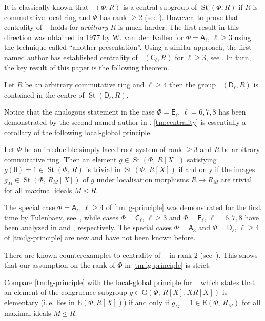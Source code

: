 \documentclass[11pt]{amsart}
\theoremstyle{plain} \declaretheorem[name=Theorem, Refname={Theorem,Theorems}]{tm} \Crefname{tm}{Theorem}{Theorems}
\numberwithin{equation}{section}
\theoremstyle{definition} \newtheorem{df}[lm]{Definition} \Crefname{df}{Definition}{Definitions}
\theoremstyle{remark} \newtheorem{rk}[lm]{Remark} \Crefname{rk}{Remark}{Remarks}
\newcommand{\E}{{\mathrm{E}}}
\newcommand{\GG}{{\mathrm{G}}}
\newcommand{\St}{\mathop{\mathrm{St}}\nolimits}
\newcommand{\Kt}{\mathop{\mathrm{K_2}}\nolimits}
\newcommand{\Ko}{\mathop{\mathrm{K_1}}\nolimits}
\newcommand{\rA}{\mathsf{A}}
\newcommand{\rC}{\mathsf{C}}
\newcommand{\rD}{\mathsf{D}}
\newcommand{\rE}{\mathsf{E}}
\begin{document}
It is classically known that $\Kt(\Phi, R)$ is a central subgroup of $\St(\Phi, R)$ if $R$ is commutative local ring and $\Phi$ has rank $\geq 2$ (see \cite{St73}).
However, to prove that centrality of $\Kt$ holds for \emph{arbitrary} $R$ is much harder.
The first result in this direction was obtained in 1977 by W. van~der~Kallen for $\Phi=\rA_\ell$, $\ell\geq 3$ using the technique called ``another presentation''.
Using a similar approach, the first-named author has established centrality of $\Kt(\rC_\ell, R)$ for $\ell\geq 3$, see \cite{Lav}.
In turn, the key result of this paper is the following theorem.
\begin{tm}\label{tm:centrality}  Let $R$ be an arbitrary commutative ring and $\ell\geq 4$ then 
the group $\Kt(\rD_\ell, R)$ is contained in the centre of $\St(\rD_\ell, R)$. \end{tm}
Notice that the analogous statement in the case $\Phi=\rE_\ell$, $\ell=6,7,8$ has been demonstrated by the second named author in \cite{SCh}.
\cref{tm:centrality} is essentially a corollary of the following local-global principle.
\begin{tm}\label{tm:lg-principle} Let $\Phi$ be an irreducible simply-laced root system of rank $\geq 3$ and $R$ be arbitrary commutative ring.
Then an element $g\in\St(\Phi,\,R[X])$ satisfying $g(0)=1\in\St(\Phi,\,R)$ is trivial in $\St(\Phi,\,R[X])$
if and only if the images $g_M\in\St(\Phi,\,R_M[X])$ of $g$ under localisation morphisms $R\to R_M$ are trivial for all maximal ideals $M\trianglelefteq R$. \end{tm} 

The special case $\Phi=\rA_\ell$, $\ell\geq 4$ of \cref{tm:lg-principle} was demonstrated for the first time by Tulenbaev, see~\cite[Theorem~2.1]{Tul},
while cases $\Phi=\rC_\ell$, $\ell\geq 3$ and $\Phi=\rE_\ell$, $\ell=6,7,8$ have been analyzed in \cite{Lav2} and \cite{SCh}, respectively.
The special cases $\Phi=\rA_3$ and $\Phi=\rD_\ell$, $\ell\geq 4$ of \cref{tm:lg-principle} are new and have not been known before.

There are known counterexamples to centrality of $\Kt$ in rank $2$ (see~\cite{W}).
This shows that our assumption on the rank of $\Phi$ in \cref{tm:lg-principle} is strict.

Compare \cref{tm:lg-principle} with the local-global principle for $\Ko$ which states that an element of the congruence subgroup $g\in \GG(\Phi,\,R[X], XR[X])$ is elementary
(i.\,e. lies in $\E(\Phi, R[X])$) if and only if $g_M=1\in\E(\Phi,\,R_M)$ for all maximal ideals $M \trianglelefteq R$.
\end{document}
